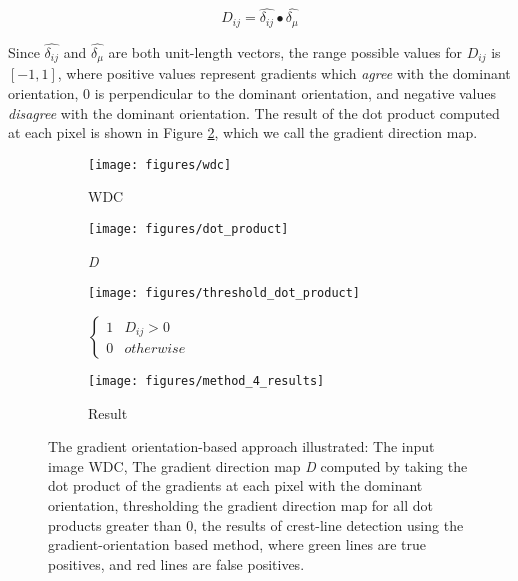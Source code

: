 \begin{equation}
D_{ij} = \hat{\delta_{ij}} \bullet \hat{\delta_{\mu}}
\end{equation}

Since $\hat{\delta_{ij}}$ and $\hat{\delta_{\mu}}$ are both unit-length vectors, the range possible values for $D_{ij}$ is $[-1, 1]$, where positive values represent gradients which \emph{agree} with the dominant orientation, 0 is perpendicular to the dominant orientation, and negative values \emph{disagree} with the dominant orientation. The result of the dot product computed at each pixel is shown in Figure \ref{fig:orientation_based_dot_product}, which we call the gradient direction map.

\begin{figure}
	\centering
	\begin{subfigure}{0.48\textwidth}
		\centering
		\texttt{[image: figures/wdc]}
		\caption{WDC}
		\label{fig:orientation_based_wdc}
	\end{subfigure}
	\begin{subfigure}{0.48\textwidth}
		\centering
		\texttt{[image: figures/dot\_product]}
		\caption{\emph{D}}
		\label{fig:orientation_based_dot_product}
	\end{subfigure}
	\begin{subfigure}{0.48\textwidth}
		\centering
		\texttt{[image: figures/threshold\_dot\_product]}
		\caption{$\begin{cases}
				1 & D_{ij} > 0\\
				0 & otherwise
			\end{cases}$}
		\label{fig:orientation_based_threshold_dot_product}
	\end{subfigure}
	\begin{subfigure}{0.48\textwidth}
		\centering
		\texttt{[image: figures/method\_4\_results]}
		\caption{Result}
		\label{fig:orientation_based_results}
	\end{subfigure}
	\caption{The gradient orientation-based approach illustrated:  The input image WDC,  The gradient direction map \emph{D} computed by taking the dot product of the gradients at each pixel with the dominant orientation,  thresholding the gradient direction map for all dot products greater than 0,  the results of crest-line detection using the gradient-orientation based method, where green lines are true positives, and red lines are false positives. }
	\label{fig:orientation_based_process}
\end{figure}

